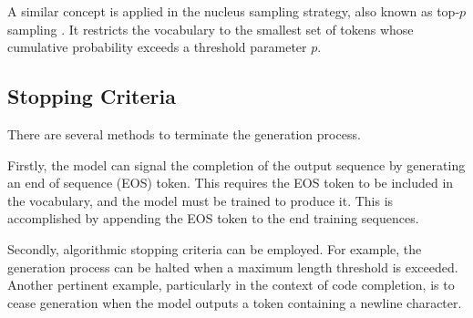A similar concept is applied in the nucleus sampling strategy, also known as top-\(p\) sampling \parencite{holtzman2019}. It restricts the vocabulary to the smallest set of tokens whose cumulative probability exceeds a threshold parameter \(p\).

\subsection{Stopping Criteria}

There are several methods to terminate the generation process.

Firstly, the model can signal the completion of the output sequence by generating an end of sequence (EOS) token. This requires the EOS token to be included in the vocabulary, and the model must be trained to produce it. This is accomplished by appending the EOS token to the end training sequences.

Secondly, algorithmic stopping criteria can be employed. For example, the generation process can be halted when a maximum length threshold is exceeded. Another pertinent example, particularly in the context of code completion, is to cease generation when the model outputs a token containing a newline character.
